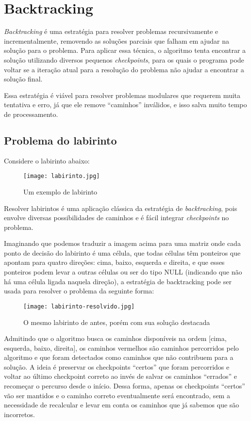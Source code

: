 \section{Backtracking} \label{sec:backtracking}

\emph{Backtracking} é uma estratégia para resolver problemas recursivamente e incrementalmente,
removendo as soluções parciais que falham em ajudar na solução para o problema. Para aplicar
essa técnica, o algoritmo tenta encontrar a solução utilizando diversos pequenos \emph{checkpoints},
para os quais o programa pode voltar se a iteração atual para a resolução do problema não ajudar a
encontrar a solução final.

Essa estratégia é viável para resolver problemas modulares que requerem muita tentativa e erro, 
já que ele remove “caminhos” inválidos, e isso salva muito tempo de processamento.

\subsection{Problema do labirinto}

Considere o labirinto abaixo:

\begin{figure}[ht]
  \centering
  \texttt{[image: labirinto.jpg]}
  \caption{Um exemplo de labirinto}
  \label{fig:labirinto}
\end{figure}

Resolver labirintos é uma aplicação clássica da estratégia de \emph{backtracking},
pois envolve diversas possibilidades de caminhos e é fácil integrar \emph{checkpoints} no problema.

Imaginando que podemos traduzir a imagem acima para uma matriz onde cada ponto de 
decisão do labirinto é uma célula, que todas células têm ponteiros que apontam para 
quatro direções: cima, baixo, esquerda e direita, e que esses ponteiros podem levar 
a outras células ou ser do tipo NULL (indicando que não há uma célula ligada naquela direção),
a estratégia de backtracking pode ser usada para resolver o problema da seguinte forma:

\begin{figure}[ht]
  \centering
  \texttt{[image: labirinto-resolvido.jpg]}
  \caption{O mesmo labirinto de antes, porém com sua solução destacada}
  \label{fig:labirinto-resolvido}
\end{figure}

Admitindo que o algoritmo busca os caminhos disponíveis na ordem [cima, esquerda, baixo, direita],
os caminhos vermelhos são caminhos percorridos pelo algoritmo e que foram detectados como caminhos
que não contribuem para a solução. A ideia é preservar os checkpoints “certos” que foram percorridos
e voltar ao último checkpoint correto ao invés de salvar os caminhos “errados” e recomeçar o percurso
desde o início. Dessa forma, apenas os checkpoints “certos” vão ser mantidos e o caminho correto
eventualmente será encontrado, sem a necessidade de recalcular e levar em conta os caminhos que 
já sabemos que são incorretos.

